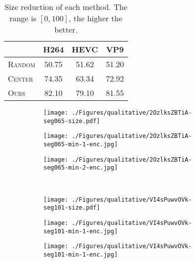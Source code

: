 \documentclass[journal,transmag]{IEEEtran}
\begin{document}
\begin{table}[t]
    \small
    \center
    \begin{tabular}{lccc}
    \toprule
    & H264 & HEVC & VP9\\
    \midrule
    \textsc{Random} & 50.75 & 51.62 & 51.20 \\
    \textsc{Center} & 74.35 & 63.34 & 72.92 \\
    \midrule
    \textsc{Ours}   & 82.10 & 79.10 & 81.55\\
    \bottomrule
    \end{tabular}
    \caption{
        Size reduction of each method.
        The range is $[0, 100]$, the higher the better.
    }
    \label{tab:size_reduction}
\end{table}\begin{figure}[t]
    \center
    \begin{subfigure}[c]{0.31\linewidth}
        \centering
        \texttt{[image: ./Figures/qualitative/2OzlksZBTiA-seg065-size.pdf]}
    \end{subfigure}
    \begin{subfigure}[c]{0.33\linewidth}
        \centering
        \texttt{[image: ./Figures/qualitative/2OzlksZBTiA-seg065-min-1-enc.jpg]}
    \end{subfigure}
    \begin{subfigure}[c]{0.33\linewidth}
        \centering
        \texttt{[image: ./Figures/qualitative/2OzlksZBTiA-seg065-min-2-enc.jpg]}
    \end{subfigure}
    \\
    \begin{subfigure}[c]{0.31\linewidth}
        \centering
        \texttt{[image: ./Figures/qualitative/VI4sPuwvOVk-seg101-size.pdf]}
    \end{subfigure}
    \begin{subfigure}[c]{0.33\linewidth}
        \centering
        \texttt{[image: ./Figures/qualitative/VI4sPuwvOVk-seg101-min-1-enc.jpg]}
    \end{subfigure}
    \begin{subfigure}[c]{0.33\linewidth}
        \centering
        \texttt{[image: ./Figures/qualitative/VI4sPuwvOVk-seg101-min-1-enc.jpg]}
    \end{subfigure}
    \\
    \begin{subfigure}[c]{0.31\linewidth}

\end{subfigure}
\end{figure}
\end{document}

